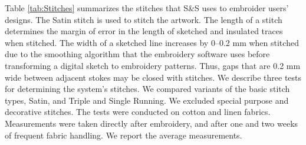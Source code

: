 \documentclass[header.tex]{subfiles}
\begin{document}
Table \ref{tab:Stitches} summarizes the stitches that S\&S uses to embroider users' designs. The Satin stitch is used to stitch the artwork. The length of a stitch determines the margin of error in the length of sketched and insulated traces when stitched. 
The width of a sketched line increases by 0--0.2 mm when stitched due to the smoothing algorithm that the embroidery software uses before transforming a digital sketch to embroidery patterns. Thus, gaps that are 0.2 mm wide between adjacent stokes may be closed with stitches. We describe three tests for determining the system's stitches. We compared variants of the basic stitch types, Satin, and Triple and Single Running. We excluded special purpose and decorative stitches. %
The tests were conducted on cotton and linen fabrics. Measurements were taken directly after embroidery, and after one and two weeks of frequent fabric handling. We report the average measurements.



  

\begin{table}[]
\centering
{}
\caption{Technical stitches for embroidering fabric traces and sensors.}
\label{tab:Stitches}
\vspace{-1.2em}
\end{table} 
\end{document}
